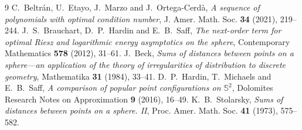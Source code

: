 \documentclass[11pt]{amsart}
\begin{document}
\begin{thebibliography}{9}
C.~Beltr\'an, U.~Etayo, J.~Marzo and J.~Ortega-Cerd\`a,
\emph{A sequence of polynomials with optimal condition number},
J. Amer. Math. Soc. \textbf{34} (2021), 219--244.
J.~S.~Brauchart, D.~P.~Hardin and E.~B.~Saff,
\emph{The next-order term for optimal Riesz and logarithmic energy
asymptotics on the sphere}, Contemporary Mathematics \textbf{578} (2012),
31--61.
J.~Beck, \emph{Sums of distances between points on a sphere---an application
of the theory of irregularities of distribution to discrete geometry},
Mathematika \textbf{31} (1984), 33--41.
D.~P.~Hardin, T.~Michaels and E.~B.~Saff,
\emph{A comparison of popular point configurations on $\mathbb S^2$},
Dolomites Research Notes on Approximation \textbf{9} (2016), 16--49.
K.~B.~Stolarsky, \emph{Sums of distances between points on a sphere. II},
Proc. Amer. Math. Soc. \textbf{41} (1973), 575--582.
\end{thebibliography}
\end{document}
